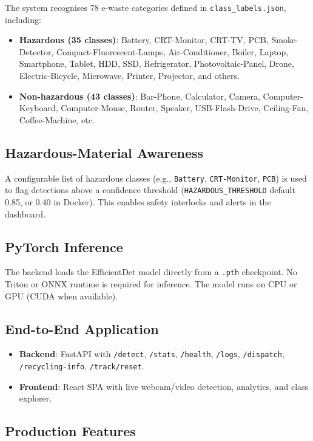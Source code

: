 \documentclass[11pt,a4paper]{article}
\begin{document}
The system recognises 78 e-waste categories defined in \texttt{class\_labels.json}, including:
\begin{itemize}[noitemsep]
    \item \textbf{Hazardous (35 classes)}: Battery, CRT-Monitor, CRT-TV, PCB, Smoke-Detector, Compact-Fluorescent-Lamps, Air-Conditioner, Boiler, Laptop, Smartphone, Tablet, HDD, SSD, Refrigerator, Photovoltaic-Panel, Drone, Electric-Bicycle, Microwave, Printer, Projector, and others.
    \item \textbf{Non-hazardous (43 classes)}: Bar-Phone, Calculator, Camera, Computer-Keyboard, Computer-Mouse, Router, Speaker, USB-Flash-Drive, Ceiling-Fan, Coffee-Machine, etc.
\end{itemize}

\subsection{Hazardous-Material Awareness}

A configurable list of hazardous classes (e.g., \texttt{Battery}, \texttt{CRT-Monitor}, \texttt{PCB}) is used to flag detections above a confidence threshold (\texttt{HAZARDOUS\_THRESHOLD} default 0.85, or 0.40 in Docker). This enables safety interlocks and alerts in the dashboard.

\subsection{PyTorch Inference}

The backend loads the EfficientDet model directly from a \texttt{.pth} checkpoint. No Triton or ONNX runtime is required for inference. The model runs on CPU or GPU (CUDA when available).

\subsection{End-to-End Application}

\begin{itemize}[noitemsep]
    \item \textbf{Backend}: FastAPI with \texttt{/detect}, \texttt{/stats}, \texttt{/health}, \texttt{/logs}, \texttt{/dispatch}, \texttt{/recycling-info}, \texttt{/track/reset}.
    \item \textbf{Frontend}: React SPA with live webcam/video detection, analytics, and class explorer.
\end{itemize}

\subsection{Production Features}
\end{document}
